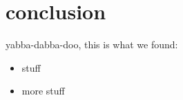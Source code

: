 \section{conclusion}
\label{sec:conclusion}
yabba-dabba-doo, this is what we found:
\begin{itemize}
\item stuff
\item more stuff
\end{itemize}